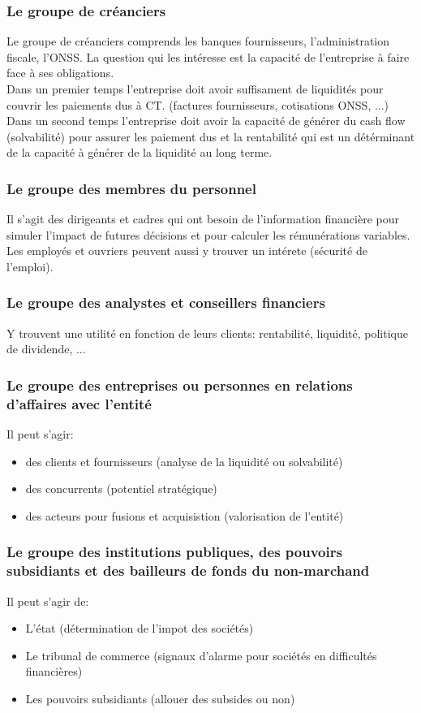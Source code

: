 \documentclass{article}
\begin{document}
\subsubsection*{Le groupe de créanciers}
Le groupe de créanciers comprends les banques fournisseurs, l'administration fiscale, l'ONSS. La question qui les intéresse est la capacité de l'entreprise à faire face à ses obligations. \\
Dans un premier temps l'entreprise doit avoir suffisament de liquidités pour couvrir les paiements dus à CT. (factures fournisseurs, cotisations ONSS, ...) \\
Dans un second temps l'entreprise doit avoir la capacité de générer du cash flow (solvabilité) pour assurer les paiement dus et la rentabilité qui est un détérminant de la capacité 
à générer de la liquidité au long terme. 

\subsubsection*{Le groupe des membres du personnel}
Il s'agit des dirigeants et cadres qui ont besoin de l'information financière pour simuler l'impact de futures décisions et pour calculer les rémunérations variables. \\
Les employés et ouvriers peuvent aussi y trouver un intérete (sécurité de l'emploi). 

\subsubsection*{Le groupe des analystes et conseillers financiers}
Y trouvent une utilité en fonction de leurs clients: rentabilité, liquidité, politique de dividende, ...

\subsubsection*{Le groupe des entreprises ou personnes en relations d'affaires avec l'entité}
Il peut s'agir:
\begin{itemize}
    \item des clients et fournisseurs (analyse de la liquidité ou solvabilité)
    \item des concurrents (potentiel stratégique)
    \item des acteurs pour fusions et acquisistion (valorisation de l'entité)
\end{itemize}

\subsubsection*{Le groupe des institutions publiques, des pouvoirs subsidiants et des bailleurs de fonds du non-marchand}
Il peut s'agir de:
\begin{itemize}
    \item L'état (détermination de l'impot des sociétés)
    \item Le tribunal de commerce (signaux d'alarme pour sociétés en difficultés financières)
    \item Les pouvoirs subsidiants (allouer des subsides ou non)
\end{itemize}
\end{document}
